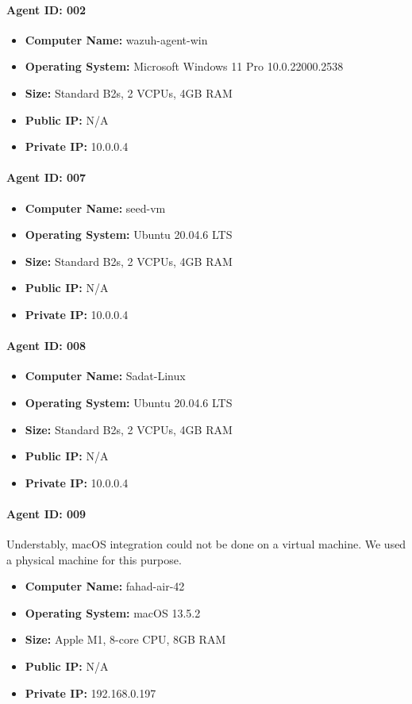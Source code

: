 \paragraph{Agent ID: 002}
\begin{itemize}
    \item \textbf{Computer Name:} wazuh-agent-win
    \item \textbf{Operating System:} Microsoft Windows 11 Pro 10.0.22000.2538
    \item \textbf{Size:} Standard B2s, 2 VCPUs, 4GB RAM
    \item \textbf{Public IP:} N/A
    \item \textbf{Private IP:} 10.0.0.4
\end{itemize}

\paragraph{Agent ID: 007}
\begin{itemize}
    \item \textbf{Computer Name:} seed-vm
    \item \textbf{Operating System:} Ubuntu 20.04.6 LTS
    \item \textbf{Size:} Standard B2s, 2 VCPUs, 4GB RAM
    \item \textbf{Public IP:} N/A
    \item \textbf{Private IP:} 10.0.0.4
\end{itemize}


\paragraph{Agent ID: 008}
\begin{itemize}
    \item \textbf{Computer Name:} Sadat-Linux
    \item \textbf{Operating System:} Ubuntu 20.04.6 LTS
    \item \textbf{Size:} Standard B2s, 2 VCPUs, 4GB RAM
    \item \textbf{Public IP:} N/A
    \item \textbf{Private IP:} 10.0.0.4
\end{itemize}

\paragraph{Agent ID: 009}
Understably, macOS integration could not be done on a virtual machine. We used a physical machine for this purpose.
\begin{itemize}
    \item \textbf{Computer Name:} fahad-air-42
    \item \textbf{Operating System:} macOS 13.5.2
    \item \textbf{Size:} Apple M1, 8-core CPU, 8GB RAM
    \item \textbf{Public IP:} N/A
    \item \textbf{Private IP:} 192.168.0.197
\end{itemize}




